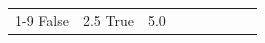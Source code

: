 \begin{table}[H]
\begin{tabular}{lllrlllll}
\cline{1-9}
False & 2.5%
\cline{1-9}
True & 5.0%

\end{tabular}
\end{table}
